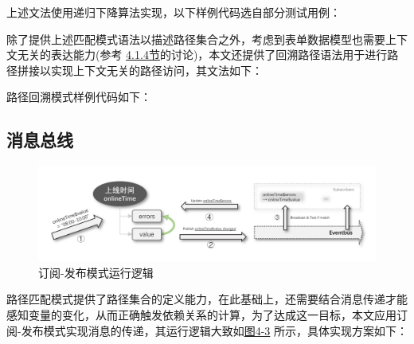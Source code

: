 \documentclass[winfonts,master,twoside]{njuthesis}
\begin{document}


上述文法使用递归下降算法\cite{burge1975recursive}实现，以下样例代码选自部分测试用例：



除了提供上述匹配模式语法以描述路径集合之外，考虑到表单数据模型也需要上下文无关的表达能力(参考 \hyperref[reactive-data-model-context-free-dependency]{4.1.4节}的讨论)，本文还提供了回溯路径语法用于进行路径拼接以实现上下文无关的路径访问，其文法如下：



路径回溯模式样例代码如下：



\subsection{消息总线}

\begin{figure}[h]
    \centering
    \includegraphics[width=\textwidth]{figure/chapter-3/eventbus-update.png}
    \caption{订阅-发布模式运行逻辑}
    \label{eventbus}
\end{figure}

路径匹配模式提供了路径集合的定义能力，在此基础上，还需要结合消息传递才能感知变量的变化，从而正确触发依赖关系的计算，为了达成这一目标，本文应用订阅-发布模式实现消息的传递，其运行逻辑大致如\hyperref[eventbus]{图4-3} 所示，具体实现方案如下：
\end{document}
